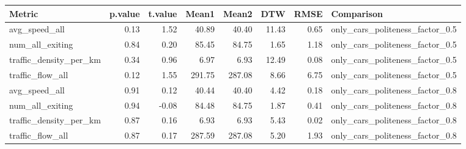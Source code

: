 \begin{table}[ht]
\centering
\begin{tabular}{lrrrrrrl}
  \hline
Metric & p.value & t.value & Mean1 & Mean2 & DTW & RMSE & Comparison \\ 
  \hline
avg\_speed\_all & 0.13 & 1.52 & 40.89 & 40.40 & 11.43 & 0.65 & only\_cars\_politeness\_factor\_0.5 \\ 
  num\_all\_exiting & 0.84 & 0.20 & 85.45 & 84.75 & 1.65 & 1.18 & only\_cars\_politeness\_factor\_0.5 \\ 
  traffic\_density\_per\_km & 0.34 & 0.96 & 6.97 & 6.93 & 12.49 & 0.08 & only\_cars\_politeness\_factor\_0.5 \\ 
  traffic\_flow\_all & 0.12 & 1.55 & 291.75 & 287.08 & 8.66 & 6.75 & only\_cars\_politeness\_factor\_0.5 \\ 
  avg\_speed\_all & 0.91 & 0.12 & 40.44 & 40.40 & 4.42 & 0.18 & only\_cars\_politeness\_factor\_0.8 \\ 
  num\_all\_exiting & 0.94 & -0.08 & 84.48 & 84.75 & 1.87 & 0.41 & only\_cars\_politeness\_factor\_0.8 \\ 
  traffic\_density\_per\_km & 0.87 & 0.16 & 6.93 & 6.93 & 5.43 & 0.02 & only\_cars\_politeness\_factor\_0.8 \\ 
  traffic\_flow\_all & 0.87 & 0.17 & 287.59 & 287.08 & 5.20 & 1.93 & only\_cars\_politeness\_factor\_0.8 \\ 
   \hline
\end{tabular}
\end{table}
